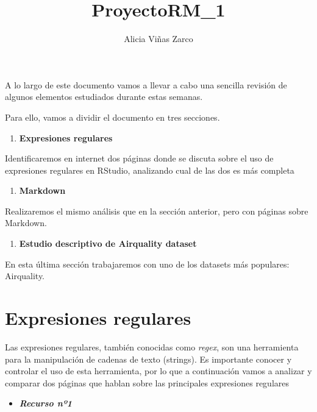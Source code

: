 \documentclass[]{article}
\title{ProyectoRM\_1}
\author{Alicia Viñas Zarco}
\date{}
\providecommand{\tightlist}{%
  \setlength{\itemsep}{0pt}\setlength{\parskip}{0pt}}
\begin{document}
\maketitle

{
\setcounter{tocdepth}{2}
\tableofcontents
}
A lo largo de este documento vamos a llevar a cabo una sencilla revisión
de algunos elementos estudiados durante estas semanas.

Para ello, vamos a dividir el documento en tres secciones.

\begin{enumerate}
\def\labelenumi{\arabic{enumi}.}
\tightlist
\item
  \textbf{Expresiones regulares}
\end{enumerate}

Identificaremos en internet dos páginas donde se discuta sobre el uso de
expresiones regulares en RStudio, analizando cual de las dos es más
completa

\begin{enumerate}
\def\labelenumi{\arabic{enumi}.}
\setcounter{enumi}{1}
\tightlist
\item
  \textbf{Markdown}
\end{enumerate}

Realizaremos el mismo análisis que en la sección anterior, pero con
páginas sobre Markdown.

\begin{enumerate}
\def\labelenumi{\arabic{enumi}.}
\setcounter{enumi}{2}
\tightlist
\item
  \textbf{Estudio descriptivo de Airquality dataset}
\end{enumerate}

En esta última sección trabajaremos con uno de los datasets más
populares: Airquality.

\hypertarget{expresiones-regulares}{%
\section{Expresiones regulares}\label{expresiones-regulares}}

Las expresiones regulares, también conocidas como \emph{regex}, son una
herramienta para la manipulación de cadenas de texto (strings). Es
importante conocer y controlar el uso de esta herramienta, por lo que a
continuación vamos a analizar y comparar dos páginas que hablan sobre
las principales expresiones regulares

\begin{itemize}
\tightlist
\item
  \textbf{\emph{Recurso nº1}}
\end{itemize}
\end{document}
